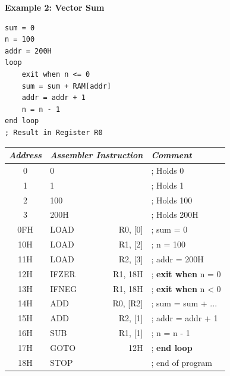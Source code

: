 \documentclass[twocolumn,english]{article}
\providecommand{\tabularnewline}{\\}
\begin{document}
\begin{table}[H]
\noindent \textbf{Example 2: Vector Sum\smallskip{}
}

\noindent \begin{minipage}[b]{0.18\textwidth}
\begin{lstlisting}[basicstyle={\scriptsize},breaklines=true,keywords={loop, exit, when, end}]
sum = 0
n = 100
addr = 200H
loop
    exit when n <= 0
    sum = sum + RAM[addr]
    addr = addr + 1
    n = n - 1
end loop
; Result in Register R0
\end{lstlisting}


\noindent \end{minipage}
\begin{minipage}[b]{0.32\textwidth}%
\begin{tabular}{clrl}
\toprule 
\emph{\footnotesize{}Address} & \multicolumn{2}{c}{\emph{\footnotesize{}Assembler Instruction}} & \emph{\footnotesize{}Comment}\tabularnewline
\midrule 
{\footnotesize{}0} & {\footnotesize{}0} &  & {\footnotesize{}; Holds 0}\tabularnewline
{\footnotesize{}1} & {\footnotesize{}1} &  & {\footnotesize{}; Holds 1}\tabularnewline
{\footnotesize{}2} & {\footnotesize{}100} &  & {\footnotesize{}; Holds 100}\tabularnewline
{\footnotesize{}3} & {\footnotesize{}200H} &  & {\footnotesize{}; Holds 200H}\tabularnewline
\midrule
{\footnotesize{}0FH} & {\footnotesize{}LOAD} & {\footnotesize{}R0, {[}0{]}} & {\footnotesize{}; sum = 0}\tabularnewline
{\footnotesize{}10H} & {\footnotesize{}LOAD} & {\footnotesize{}R1, {[}2{]}} & {\footnotesize{}; n = 100}\tabularnewline
{\footnotesize{}11H} & {\footnotesize{}LOAD} & {\footnotesize{}R2, {[}3{]}} & {\footnotesize{}; addr = 200H}\tabularnewline
{\footnotesize{}12H} & {\footnotesize{}IFZER} & {\footnotesize{}R1, 18H} & {\footnotesize{}; }\textbf{\footnotesize{}exit when}{\footnotesize{}
n = 0}\tabularnewline
{\footnotesize{}13H} & {\footnotesize{}IFNEG} & {\footnotesize{}R1, 18H} & {\footnotesize{}; }\textbf{\footnotesize{}exit when}{\footnotesize{}
n \textless{} 0}\tabularnewline
{\footnotesize{}14H} & {\footnotesize{}ADD} & {\footnotesize{}R0, {[}R2{]}} & {\footnotesize{}; sum = sum + ...}\tabularnewline
{\footnotesize{}15H} & {\footnotesize{}ADD} & {\footnotesize{}R2, {[}1{]}} & {\footnotesize{}; addr = addr + 1}\tabularnewline
{\footnotesize{}16H} & {\footnotesize{}SUB} & {\footnotesize{}R1, {[}1{]}} & {\footnotesize{}; n = n - 1}\tabularnewline
{\footnotesize{}17H} & {\footnotesize{}GOTO} & {\footnotesize{}12H} & {\footnotesize{}; }\textbf{\footnotesize{}end loop}\tabularnewline
{\footnotesize{}18H} & {\footnotesize{}STOP} &  & {\footnotesize{}; end of program}\tabularnewline
\bottomrule
\end{tabular}

\noindent \centering{}\end{minipage}
\end{table}
\end{document}
